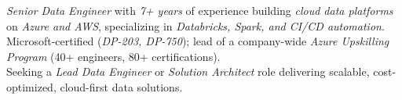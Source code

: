 
\textit{Senior Data Engineer} with \textit{7+ years} of experience building \textit{cloud data platforms} on \textit{Azure and AWS}, specializing in \textit{Databricks, Spark, and CI/CD automation}. \\
Microsoft-certified (\textit{DP-203, DP-750}); lead of a company-wide \textit{Azure Upskilling Program} (40+ engineers, 80+ certifications). \\
Seeking a \textit{Lead Data Engineer} or \textit{Solution Architect} role delivering scalable, cost-optimized, cloud-first data solutions.
